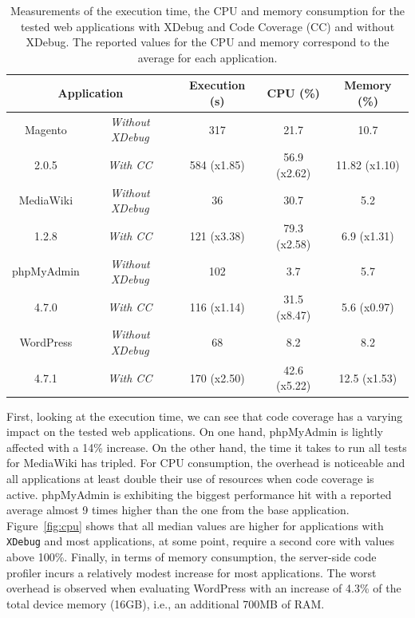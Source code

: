 \begin{table}[]
  \centering
  \caption{Measurements of the execution time, the CPU and memory consumption for the tested web applications with XDebug and Code Coverage (CC) and without XDebug. The reported values for the CPU and memory correspond to the average for each application.}
  \label{table:performance}
\begin{tabular}{|c|c|c|c|c|}
\hline
\multicolumn{2}{|c|}{\textbf{Application}}              & \textbf{Execution (s)} & \textbf{CPU (\%)}       & \textbf{Memory (\%)}   \\ \hline
Magento     & \textit{Without XDebug} & 317           & 21.7           & 10.7          \\ \cline{2-5}
2.0.5       & \textit{With CC}    & 584 (x1.85)   & 56.9 (x2.62)   & 11.82 (x1.10) \\ \hline
MediaWiki   & \textit{Without XDebug} & 36            & 30.7           & 5.2           \\ \cline{2-5}
1.2.8       & \textit{With CC}    & 121 (x3.38)   & 79.3 (x2.58)   & 6.9 (x1.31)   \\ \hline
phpMyAdmin  & \textit{Without XDebug} & 102           & 3.7            & 5.7           \\ \cline{2-5}
4.7.0       & \textit{With CC}    & 116 (x1.14)   & 31.5 (x8.47)   & 5.6 (x0.97)   \\ \hline
WordPress   & \textit{Without XDebug} & 68            & 8.2            & 8.2           \\ \cline{2-5}
4.7.1       & \textit{With CC}    & 170 (x2.50)   & 42.6 (x5.22)   & 12.5 (x1.53)  \\ \hline
\end{tabular}
\end{table}

First, looking at the execution time, we can see that code coverage has a
varying impact on the tested web applications.
On one hand, phpMyAdmin is lightly affected with a 14\% increase.
On the other hand, the time it takes to run all tests for MediaWiki has
tripled.
For CPU consumption, the overhead is noticeable and all applications at
least double their use of resources when code coverage is active.
phpMyAdmin is exhibiting the biggest performance hit with a reported
average almost 9 times higher than the one from the base application.
Figure~\ref{fig:cpu} shows that all median values are higher for applications
with \texttt{XDebug} and most applications, at some point, require a second
core with values above 100\%. Finally, in terms of memory consumption,
the server-side code profiler incurs a relatively modest increase for most
applications. The worst overhead is observed when evaluating WordPress with
an increase of 4.3\% of the total device memory (16GB), i.e., an additional
700MB of RAM.

